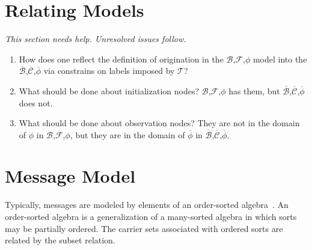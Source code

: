 \documentclass[12pt]{article}
\newcommand{\bun}{\ensuremath{\mathcal{B}}}
\newcommand{\tran}{\ensuremath{\mathcal{T}}}
\newcommand{\comp}{\ensuremath{\mathcal{C}}}
\newcommand{\family}{\ensuremath{\mathcal{F}}}
\newcommand{\cbar}[1]{\ensuremath{\overline{#1}}}
\begin{document}
\section{Relating Models}

\emph{This section needs help.  Unresolved issues follow.}

\begin{enumerate}
\item How does one reflect the definition of origination in the
  \bun,\family,$\phi$ model into the \cbar\bun,\cbar\comp,$\cbar\phi$
  via constrains on labels imposed by \tran?
\item What should be done about initialization nodes?
  \bun,\family,$\phi$ has them, but \cbar\bun,\cbar\comp,$\cbar\phi$
  does not.
\item What should be done about observation nodes?  They are not in
  the domain of $\phi$ in \bun,\family,$\phi$, but they are in
  the domain of $\cbar\phi$ in \cbar\bun,\cbar\comp,$\cbar\phi$.
\end{enumerate}

\section{Message Model}\label{sec:message model}

Typically, messages are modeled by elements of an order-sorted
algebra~\cite{GoguenMeseguer92}. An order-sorted algebra is a
generalization of a many-sorted algebra in which sorts may be
partially ordered.  The carrier sets associated with ordered sorts are
related by the subset relation.
\end{document}
